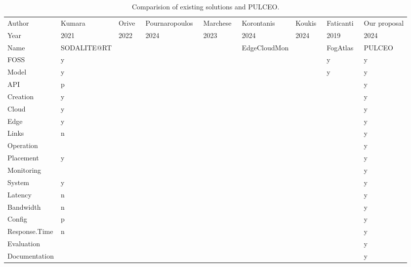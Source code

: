 \begin{table*}[b]

\caption{\label{tab:comparison-of-existing-solutions-and-pulceo}Comparision of existing solutions and PULCEO.}
\centering
\begin{tabu} to 
\toprule
Author & Kumara~\cite{kumaraSODALITERTOrchestrating2021} & Orive~\cite{oriveQualityServiceAware2022} & Pournaropoulos~\cite{pournaropoulosFluidityProvidingFlexible2024} & Marchese~\cite{marcheseSophosFrameworkApplication2023} & Korontanis~\cite{korontanisEdgeCloudMonLightweight2024} & Koukis~\cite{koukisOpenSourceExperimentationFramework2024} & Faticanti~\cite{faticantiCuttingThroughputEdge2019} & Our proposal\\
Year & 2021 & 2022 & 2024 & 2023 & 2024 & 2024 & 2019 & 2024\\
Name & SODALITE@RT &  &  &  & EdgeCloudMon &  & FogAtlas & PULCEO\\
FOSS & y &  &  &  &  &  & y & y\\
Model & y &  &  &  &  &  & y & y\\
API & p &  &  &  &  &  &  & y\\
Creation & y &  &  &  &  &  &  & y\\
Cloud & y &  &  &  &  &  &  & y\\
Edge & y &  &  &  &  &  &  & y\\
Links & n &  &  &  &  &  &  & y\\
Operation &  &  &  &  &  &  &  & y\\
Placement & y &  &  &  &  &  &  & y\\
Monitoring &  &  &  &  &  &  &  & y\\
System & y &  &  &  &  &  &  & y\\
Latency & n &  &  &  &  &  &  & y\\
Bandwidth & n &  &  &  &  &  &  & y\\
Config & p &  &  &  &  &  &  & y\\
Response.Time & n &  &  &  &  &  &  & y\\
Evaluation &  &  &  &  &  &  &  & y\\
Documentation &  &  &  &  &  &  &  & y\\
\bottomrule
\end{tabu}
\end{table*}
